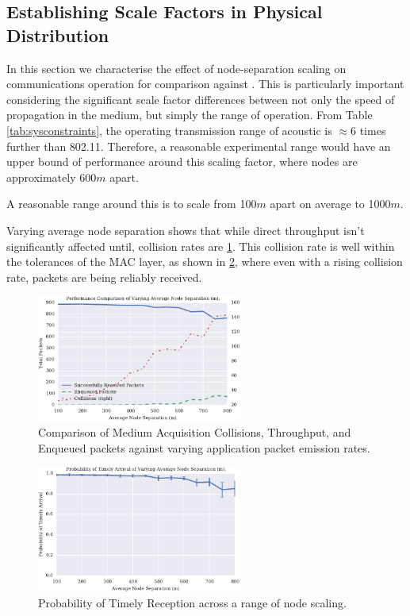 \documentclass[runningheads,a4paper]{llncs}
\begin{document}
\subsection{Establishing Scale Factors in Physical Distribution}

In this section we characterise the effect of node-separation scaling on communications operation for comparison against \cite{Guo11}. This is particularly important considering the significant scale factor differences between not only the speed of propagation in the medium, but simply the range of operation. 
From Table \ref{tab:sysconstraints}, the operating transmission range of acoustic is $\approx 6$ times further than 802.11. Therefore, a reasonable experimental range would have an upper bound of performance around this scaling factor, where nodes are approximately 600$m$ apart. 

A reasonable range around this is to scale from 100$m$ apart on average to 1000$m$.

Varying average node separation shows that while direct throughput isn't significantly affected until, collision rates are \ref{fig:throughput_performance_range}.
This collision rate is well within the tolerances of the MAC layer, as shown in \ref{fig:prod_breakdown_range}, where even with a rising collision rate, packets are being reliably received.

\begin{figure}[H]
  \centering
  \includegraphics[width=0.6\textwidth]{img/throughput_performance_range.pdf}
  \caption{Comparison of Medium Acquisition Collisions, Throughput, and Enqueued packets against varying application packet emission rates.}
  \label{fig:throughput_performance_range}
\end{figure}

\begin{figure}[H]
  \centering
  \includegraphics[width=0.6\textwidth]{img/prod_breakdown_range.pdf}
  \caption{Probability of Timely Reception across a range of node scaling.}
  \label{fig:prod_breakdown_range}
\end{figure}
\end{document}
